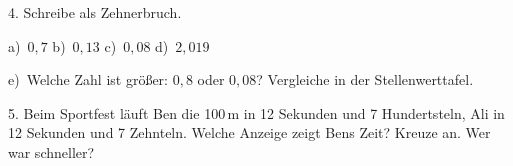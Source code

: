 \documentclass[11pt]{article}
\begin{document}
\begin{pfaufg}{}{4.}{}
Schreibe als Zehnerbruch. \par\vspace{3pt} a)~$0{,}7$ \qquad b)~$0{,}13$ \qquad c)~$0{,}08$ \qquad d)~$2{,}019$ \par\vspace{3pt} e)~Welche Zahl ist größer: $0{,}8$ oder $0{,}08$? Vergleiche in der Stellenwerttafel.
\end{pfaufg}

\begin{pfaufg}{}{5.}{}
Beim Sportfest läuft Ben die 100\,m in 12 Sekunden und 7 Hundertsteln, Ali in 12 Sekunden und 7 Zehnteln. Welche Anzeige zeigt Bens Zeit? Kreuze an. Wer war schneller?\par\smallskip {}\par {}
\end{pfaufg}
\end{document}
